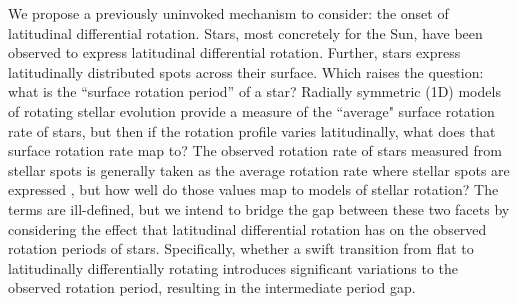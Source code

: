 
We propose a previously uninvoked mechanism to consider: the onset of latitudinal differential rotation.
Stars, most concretely for the Sun, have been observed to express latitudinal differential rotation.
Further, stars express latitudinally distributed spots across their surface.
Which raises the question: what is the ``surface rotation period'' of a star?
Radially symmetric (1D) models of rotating stellar evolution provide a measure of the ``average" surface rotation rate of stars, but then if the rotation profile varies latitudinally, what does that surface rotation rate map to?
The observed rotation rate of stars measured from stellar spots is generally taken as the average rotation rate where stellar spots are expressed \citep{santos_surface_2021}, but how well do those values map to models of stellar rotation?
The terms are ill-defined, but we intend to bridge the gap between these two facets by considering the effect that latitudinal differential rotation has on the observed rotation periods of stars.
Specifically, whether a swift transition from flat to latitudinally differentially rotating introduces significant variations to the observed rotation period, resulting in the intermediate period gap.

